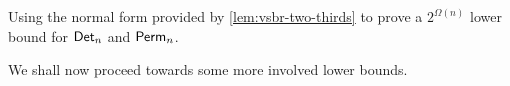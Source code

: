 \begin{exercise}
Using the normal form provided by \autoref{lem:vsbr-two-thirds} to prove a $2^{\Omega(n)}$ lower bound for $\operatorname{\mathsf{Det}}_n$ and $\operatorname{\mathsf{Perm}}_n$. 
\end{exercise}

We shall now proceed towards some more involved lower bounds. 



